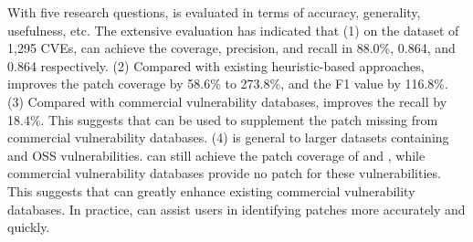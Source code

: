 \begin{abstract*}
With five research questions, \tool is evaluated in terms of accuracy, generality, usefulness, etc. The extensive evaluation has indicated that (1) on the dataset of 1,295 CVEs, \tool can achieve the coverage, precision, and recall in 88.0\%, 0.864, and 0.864 respectively. (2) Compared with existing heuristic-based approaches, \tool improves the patch coverage by 58.6\% to 273.8\%, and the F1 value by 116.8\%. (3) Compared with commercial vulnerability databases, \tool improves the recall by 18.4\%. This suggests that \tool can be used to supplement the patch missing from commercial vulnerability databases. (4) \tool is general to larger datasets containing  and  OSS vulnerabilities. \tool can still achieve the patch coverage of  and , while commercial vulnerability databases provide no patch for these vulnerabilities. This suggests that \tool can greatly enhance existing commercial vulnerability databases. In practice, \tool can assist users in identifying patches more accurately and quickly.
\end{abstract*}